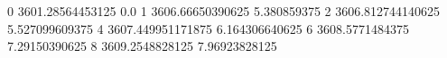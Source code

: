 0 3601.28564453125 0.0
1 3606.66650390625 5.380859375
2 3606.812744140625 5.527099609375
4 3607.449951171875 6.164306640625
6 3608.5771484375 7.29150390625
8 3609.2548828125 7.96923828125
